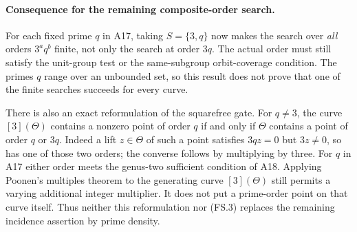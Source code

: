 \paragraph{Consequence for the remaining composite-order search.}
For each fixed prime $q$ in A17, taking $S=\{3,q\}$ now makes
the search over \emph{all} orders $3^a q^b$ finite, not only
the search at order $3q$. The actual order must still satisfy
the unit-group test or the same-subgroup orbit-coverage condition.
The primes $q$ range over an unbounded set, so this result does
not prove that one of the finite searches succeeds for every
curve.

There is also an exact reformulation of the squarefree gate.
For $q\ne3$, the curve $[3](\Theta)$ contains a nonzero point
of order $q$ if and only if $\Theta$ contains a point of order
$q$ or $3q$. Indeed a lift $z\in\Theta$ of such a point
satisfies $3qz=0$ but $3z\ne0$, so has one of those two orders;
the converse follows by multiplying by three.
For $q$ in A17 either order meets the genus-two sufficient
condition of A18. Applying Poonen's multiples theorem to the
generating curve $[3](\Theta)$ still permits a varying additional
integer multiplier. It does not put a prime-order point on that
curve itself. Thus neither this reformulation nor (FS.3)
replaces the remaining incidence assertion by prime density.

